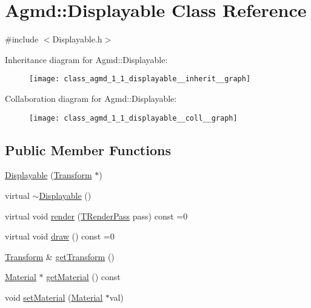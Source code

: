 \hypertarget{class_agmd_1_1_displayable}{\section{Agmd\+:\+:Displayable Class Reference}
\label{class_agmd_1_1_displayable}
}


{\ttfamily \#include $<$Displayable.\+h$>$}



Inheritance diagram for Agmd\+:\+:Displayable\+:\nopagebreak
\begin{figure}[H]
\begin{center}
\leavevmode
\texttt{[image: class\_agmd\_1\_1\_displayable\_\_inherit\_\_graph]}
\end{center}
\end{figure}


Collaboration diagram for Agmd\+:\+:Displayable\+:\nopagebreak
\begin{figure}[H]
\begin{center}
\leavevmode
\texttt{[image: class\_agmd\_1\_1\_displayable\_\_coll\_\_graph]}
\end{center}
\end{figure}
\subsection*{Public Member Functions}
\begin{DoxyCompactItemize}
\item 
\hyperlink{class_agmd_1_1_displayable_af2c5d12af29a875226963ab4b8d76d9e}{Displayable} (\hyperlink{class_agmd_maths_1_1_transform}{Transform} $\ast$)
\item 
virtual \hyperlink{class_agmd_1_1_displayable_a18780095e5b049d3a3d43a748a541605}{$\sim$\+Displayable} ()
\item 
virtual void \hyperlink{class_agmd_1_1_displayable_acf6e45b6cf747a2dd6a8ca7ebf6805fe}{render} (\hyperlink{namespace_agmd_a893087981df53d0bf39466e9039aeb73}{T\+Render\+Pass} pass) const =0
\item 
virtual void \hyperlink{class_agmd_1_1_displayable_aa6bd5ead2497fe7dfee8c110219dc9a2}{draw} () const =0
\item 
\hyperlink{class_agmd_maths_1_1_transform}{Transform} \& \hyperlink{class_agmd_1_1_displayable_a7d447fca5a01a63dbe5ae969ca40a8bd}{get\+Transform} ()
\item 
\hyperlink{class_agmd_1_1_material}{Material} $\ast$ \hyperlink{class_agmd_1_1_displayable_a01f9693c7fdae204d745fadb43bb2dbe}{get\+Material} () const 
\item 
void \hyperlink{class_agmd_1_1_displayable_a2b950738ad797c55b82406e794546d90}{set\+Material} (\hyperlink{class_agmd_1_1_material}{Material} $\ast$val)
\end{DoxyCompactItemize}
